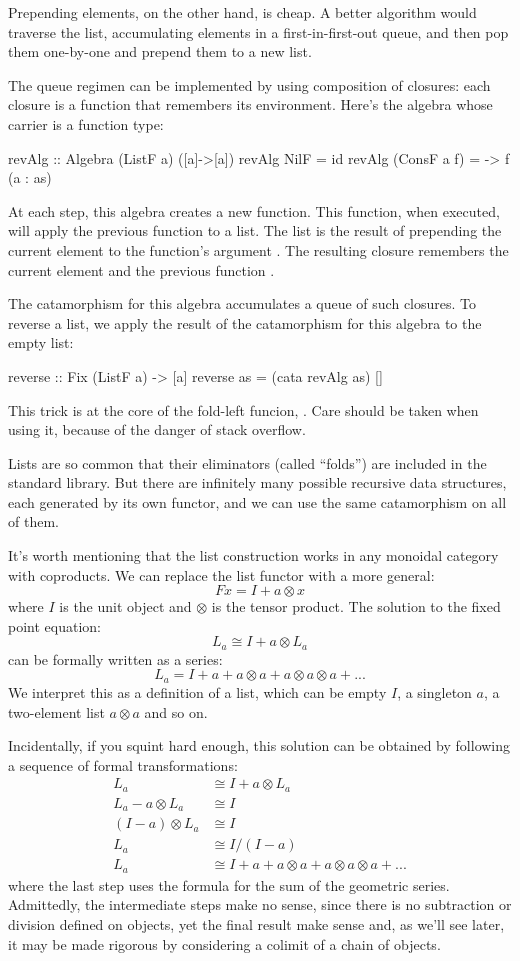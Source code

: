 \documentclass[DaoFP]{subfiles}
\begin{document}
Prepending elements, on the other hand, is cheap. A better algorithm would traverse the list, accumulating elements in a first-in-first-out queue, and then pop them one-by-one and prepend them to a new list. 

The queue regimen can be implemented by using composition of closures: each closure is a function that remembers its environment. Here's the algebra whose carrier is a function type:
\begin{haskell}
revAlg :: Algebra (ListF a) ([a]->[a])
revAlg NilF = id
revAlg (ConsF a f) = \as -> f (a : as)
\end{haskell}
At each step, this algebra creates a new function. This function, when executed, will apply the previous function  to a list. The list is the result of prepending the current element  to the function's argument . The resulting closure remembers the current element  and the previous function .

The catamorphism for this algebra accumulates a queue of such closures. To reverse a list, we apply the result of the catamorphism for this algebra to the empty list:
\begin{haskell}
reverse :: Fix (ListF a) -> [a]
reverse as = (cata revAlg as) []
\end{haskell}
This trick is at the core of the fold-left funcion, . Care should be taken when using it, because of the danger of stack overflow. 

Lists are so common that their eliminators (called ``folds'') are included in the standard library. But there are infinitely many possible recursive data structures, each generated by its own functor, and we can use the same catamorphism on all of them.

It's worth mentioning that the list construction works in any monoidal category with coproducts. We can replace the list functor with a more general:
\[ F x = I + a \otimes x \]
where $I$ is the unit object and $\otimes$ is the tensor product. The solution to the fixed point equation:
\[ L_a \cong I + a \otimes L_a \]
can be formally written as a series:
\[ L_a = I + a + a \otimes a + a \otimes a \otimes a + ... \]
We interpret this as a definition of a list, which can be empty $I$, a singleton $a$, a two-element list $a \otimes a$ and so on.

Incidentally, if you squint hard enough, this solution can be obtained by following a sequence of formal transformations:
\begin{align*}
L_a &\cong I + a \otimes L_a
\\
L_a - a \otimes L_a &\cong I
\\
(I - a) \otimes L_a &\cong I
\\
L_a &\cong I / (I - a)
\\
L_a &\cong I + a + a \otimes a + a \otimes a \otimes a + ...
\end{align*}
where the last step uses the formula for the sum of the geometric series. Admittedly, the intermediate steps make no sense, since there is no subtraction or division defined on objects, yet the final result make sense and, as we'll see later, it may be made rigorous by considering a colimit of a chain of objects.
\end{document}
